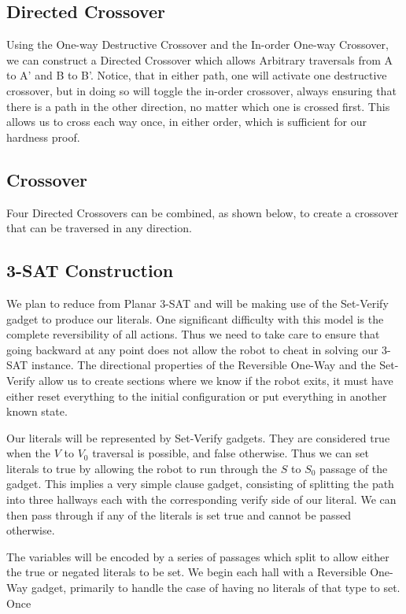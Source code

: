 \documentclass[11pt]{article}
\begin{document}
\subsection{Directed Crossover}
Using the One-way Destructive Crossover and the In-order One-way Crossover, we can construct a Directed Crossover which allows Arbitrary traversals from A to A' and B to B'. Notice, that in either path, one will activate one destructive crossover, but in doing so will toggle the in-order crossover, always ensuring that there is a path in the other direction, no matter which one is crossed first. This allows us to cross each way once, in either order, which is sufficient for our hardness proof.

\subsection{Crossover}
Four Directed Crossovers can be combined, as shown below, to create a crossover that can be traversed in any direction.

\subsection{3-SAT Construction}
We plan to reduce from Planar 3-SAT and will be making use of the Set-Verify gadget to produce our literals. One significant difficulty with this model is the complete reversibility of all actions. Thus we need to take care to ensure that going backward at any point does not allow the robot to cheat in solving our 3-SAT instance. The directional properties of the Reversible One-Way and the Set-Verify allow us to create sections where we know if the robot exits, it must have either reset everything to the initial configuration or put everything in another known state.

Our literals will be represented by Set-Verify gadgets. They are considered true when the $V$ to $V_0$ traversal is possible, and false otherwise. Thus we can set literals to true by allowing the robot to run through the $S$ to $S_0$ passage of the gadget. This implies a very simple clause gadget, consisting of splitting the path into three hallways each with the corresponding verify side of our literal. We can then pass through if any of the literals is set true and cannot be passed otherwise.

The variables will be encoded by a series of passages which split to allow either the true or negated literals to be set. We begin each hall with a Reversible One-Way gadget, primarily to handle the case of having no literals of that type to set. Once 
\end{document}
